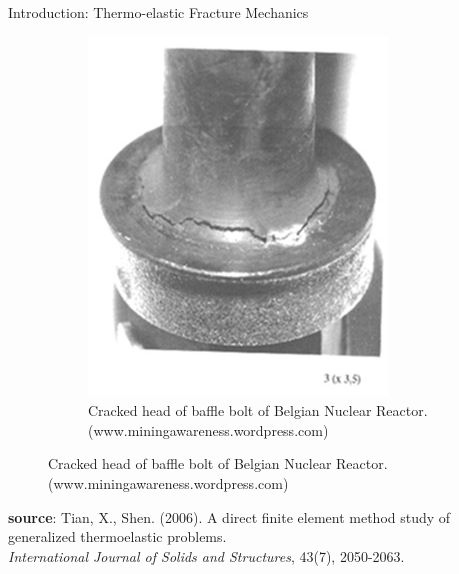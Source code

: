 \documentclass{beamer}
\begin{document}
\begin{frame}[t,fragile]{Introduction: Thermo-elastic Fracture Mechanics}
\begin{figure}[H]
\begin{subfigure}{0.45\textwidth}
 \includegraphics[scale=.1]{fail.jpg}
 \caption{\tiny{Cracked head of baffle bolt of Belgian Nuclear Reactor.(www.miningawareness.wordpress.com)}}
 \label{fail}
 \end{subfigure}
 \end{figure}
 \vspace{-.3cm}
   \tiny
   \hspace{15pt}
   \textbf{source}: Tian, X., Shen. (2006). A direct finite element method study of generalized thermoelastic problems. \\
   \vspace{-7pt}
   \hspace{15pt}
   \emph{International Journal of Solids and Structures}, 43(7), 2050-2063.
\end{frame}
\end{document}

